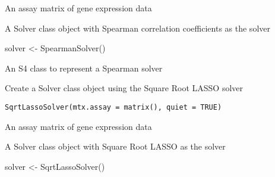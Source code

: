\documentclass[a4paper]{book}
\begin{document}
%
\begin{Arguments}
\begin{ldescription}
\item[\code{mtx.assay}] An assay matrix of gene expression data
\end{ldescription}
\end{Arguments}
%
\begin{Value}
A Solver class object with Spearman correlation coefficients as the solver
\end{Value}
%
\begin{Examples}
\begin{ExampleCode}
solver <- SpearmanSolver()
\end{ExampleCode}
\end{Examples}
%
\begin{Description}\relax
An S4 class to represent a Spearman solver
\end{Description}
%
\begin{Description}\relax
Create a Solver class object using the Square Root LASSO solver
\end{Description}
%
\begin{Usage}
\begin{verbatim}
SqrtLassoSolver(mtx.assay = matrix(), quiet = TRUE)
\end{verbatim}
\end{Usage}
%
\begin{Arguments}
\begin{ldescription}
\item[\code{mtx.assay}] An assay matrix of gene expression data
\end{ldescription}
\end{Arguments}
%
\begin{Value}
A Solver class object with Square Root LASSO as the solver
\end{Value}
%
\begin{Examples}
\begin{ExampleCode}
solver <- SqrtLassoSolver()
\end{ExampleCode}
\end{Examples}
\end{document}
